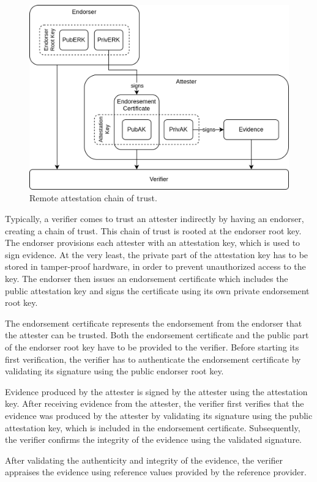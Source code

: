 \begin{figure}[H]
  \centering
  \includegraphics[width=0.7\linewidth]{resources/ra-chain-of-trust.drawio.png}
  \caption{Remote attestation chain of trust.}
  \label{fig:ra-chain-of-trust}
\end{figure}

Typically, a verifier comes to trust an attester indirectly by having an
endorser, creating a chain of trust. This chain of trust is rooted at the
endorser root key. The endorser provisions each attester with an attestation
key, which is used to sign evidence. At the very least, the private part of the
attestation key has to be stored in tamper-proof hardware, in order to prevent
unauthorized access to the key. The endorser then issues an endorsement
certificate which includes the public attestation key and signs the certificate
using its own private endorsement root key.

The endorsement certificate represents the endorsement from the endorser that
the attester can be trusted. Both the endorsement certificate and the public
part of the endorser root key have to be provided to the verifier. Before
starting its first verification, the verifier has to authenticate the
endorsement certificate by validating its signature using the public endorser
root key.

Evidence produced by the attester is signed by the attester using the
attestation key. After receiving evidence from the attester, the verifier first
verifies that the evidence was produced by the attester by validating its
signature using the public attestation key, which is included in the endorsement
certificate. Subsequently, the verifier confirms the integrity of the evidence
using the validated signature.

After validating the authenticity and integrity of the evidence, the verifier
appraises the evidence using reference values provided by the reference
provider.

